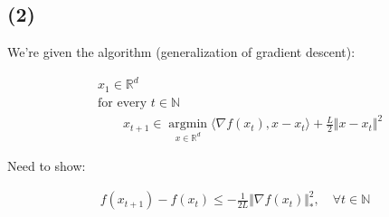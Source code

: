 \documentclass{article}
\begin{document}
\subsection*{(2)}

We're given the algorithm (generalization of gradient descent):

\begin{align*}
    &x_1 \in \mathbb{R}^d \\
    &\text{for every } t \in \mathbb{N} \\
    &\qquad x_{t + 1} \in \underset{x \in \mathbb{R}^d}{\operatorname{argmin}} \langle \nabla f ( x_t ), x - x_t \rangle + \frac{L}{2} \Vert x - x_t \Vert^2 
\end{align*}

Need to show:

\begin{align*}
    f ( x_{t + 1} ) - f ( x_t ) \leq - \frac{1}{2 L} \Vert \nabla f ( x_t ) \Vert_*^2 , \quad \forall t \in \mathbb{N} 
\end{align*}
\end{document}
